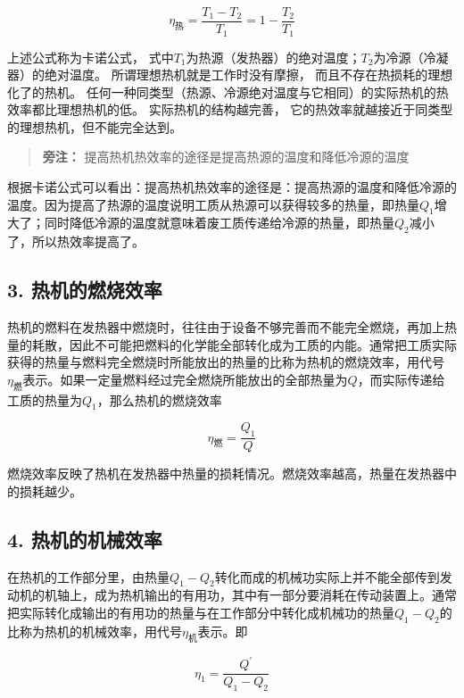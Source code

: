 \[
\eta_ {\mathrm{热}} = \frac {T _ {1} - T _ {2}}{T _ {1}} = 1 - \frac {T _ {2}}{T _ {1}} \tag {9.16}
\]

上述公式称为卡诺公式，
式中\(T_{1}\)为热源（发热器）的绝对温度；\(T_{2}\)为冷源（冷凝器）的绝对温度。
所谓理想热机就是工作时没有摩擦， 而且不存在热损耗的理想化了的热机。
任何一种同类型（热源、冷源绝对温度与它相同）的实际热机的热效率都比理想热机的低。
实际热机的结构越完善，
它的热效率就越接近于同类型的理想热机，但不能完全达到。

\begin{quote}
\textbf{旁注：} 提高热机热效率的途径是提高热源的温度和降低冷源的温度
\end{quote}

根据卡诺公式可以看出：提高热机热效率的途径是：提高热源的温度和降低冷源的温度。因为提高了热源的温度说明工质从热源可以获得较多的热量，即热量\(Q_{1}\)增大了；同时降低冷源的温度就意味着废工质传递给冷源的热量，即热量\(Q_{2}\)减小了，所以热效率提高了。

\subsection{3.
热机的燃烧效率}\label{ux70edux673aux7684ux71c3ux70e7ux6548ux7387}

热机的燃料在发热器中燃烧时，往往由于设备不够完善而不能完全燃烧，再加上热量的耗散，因此不可能把燃料的化学能全部转化成为工质的内能。通常把工质实际获得的热量与燃料完全燃烧时所能放出的热量的比称为热机的燃烧效率，用代号\(\eta_{\text{燃}}\)表示。如果一定量燃料经过完全燃烧所能放出的全部热量为\(Q\)，而实际传递给工质的热量为\(Q_{1}\)，那么热机的燃烧效率

\[
\eta_ {\text{燃}} = \frac {Q _ {1}}{Q} \tag {9.17}
\]

燃烧效率反映了热机在发热器中热量的损耗情况。燃烧效率越高，热量在发热器中的损耗越少。

\subsection{4.
热机的机械效率}\label{ux70edux673aux7684ux673aux68b0ux6548ux7387}

在热机的工作部分里，由热量\(Q_{1} - Q_{2}\)转化而成的机械功实际上并不能全部传到发动机的机轴上，成为热机输出的有用功，其中有一部分要消耗在传动装置上。通常把实际转化成输出的有用功的热量与在工作部分中转化成机械功的热量\(Q_{1} - Q_{2}\)的比称为热机的机械效率，用代号\(\eta_{\text{机}}\)表示。即

\[
\eta_ {1} = \frac {Q ^ {\prime}}{Q _ {1} - Q _ {2}} \tag {9.18}
\]

